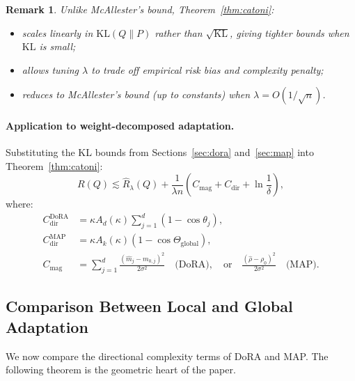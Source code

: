 \documentclass[11pt]{article}
\newtheorem{remark}[theorem]{Remark}
\newcommand{\KL}{\mathrm{KL}}
\newcommand{\Ad}{A_d}
\newcommand{\Ak}{A_k}
\newcommand{\Rhatl}{\hat{R}_\lambda}
\begin{document}
\begin{remark}
Unlike McAllester's bound, Theorem~\ref{thm:catoni}:
\begin{itemize}
  \item scales linearly in $\KL(Q\|P)$ rather than $\sqrt{\KL}$,
    giving tighter bounds when $\KL$ is small;
  \item allows tuning $\lambda$ to trade off empirical risk bias and
    complexity penalty;
  \item reduces to McAllester's bound (up to constants) when
    $\lambda = O(1/\sqrt{n})$.
\end{itemize}
\end{remark}

\paragraph{Application to weight-decomposed adaptation.}
Substituting the KL bounds from Sections~\ref{sec:dora} and~\ref{sec:map}
into Theorem~\ref{thm:catoni}:
\[
  R(Q) \lesssim \Rhatl(Q) + \frac{1}{\lambda n}
  \left(C_{\mathrm{mag}} + C_{\mathrm{dir}} + \ln\frac{1}{\delta}\right),
\]
where:
\begin{align*}
  C^{\mathrm{DoRA}}_{\mathrm{dir}}
  &= \kappa \Ad(\kappa) \sum_{j=1}^d (1 - \cos\theta_j),\\
  C^{\mathrm{MAP}}_{\mathrm{dir}}
  &= \kappa \Ak(\kappa)(1 - \cos\Theta_{\mathrm{global}}),\\
  C_{\mathrm{mag}}
  &= \sum_{j=1}^d \frac{(\hat{m}_j - m_{0,j})^2}{2\sigma^2}
    \quad \text{(DoRA)}, \quad
    \text{or}\quad
    \frac{(\hat\rho - \rho_0)^2}{2\sigma^2}
    \quad \text{(MAP)}.
\end{align*}

\subsection{Comparison Between Local and Global Adaptation}
\label{sec:comparison}

We now compare the directional complexity terms of DoRA and MAP.
The following theorem is the geometric heart of the paper.
\end{document}
